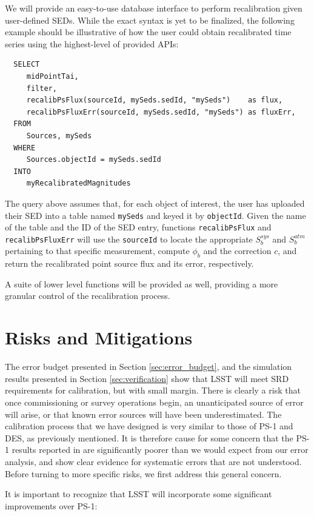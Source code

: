 \documentclass[12pt,preprint]{aastex}
\begin{document}
We will provide an easy-to-use database interface to perform recalibration given user-defined SEDs. While the exact syntax is yet to be finalized, the following example should be illustrative of how the user could obtain recalibrated time series using the highest-level of provided APIs:
%
\begin{verbatim}
  SELECT
     midPointTai,
     filter,
     recalibPsFlux(sourceId, mySeds.sedId, "mySeds")    as flux,
     recalibPsFluxErr(sourceId, mySeds.sedId, "mySeds") as fluxErr,
  FROM
     Sources, mySeds
  WHERE
     Sources.objectId = mySeds.sedId
  INTO
     myRecalibratedMagnitudes
\end{verbatim}
%
The query above assumes that, for each object of interest, the user has uploaded their SED into a table named {\tt mySeds} and keyed it by {\tt objectId}. Given the name of the table and the ID of the SED entry, functions {\tt recalibPsFlux} and {\tt recalibPsFluxErr} will use the {\tt sourceId} to locate the appropriate $S_b^{sys}$ and $S_b^{atm}$ pertaining to that specific measurement, compute $\phi_b$ and the correction $c$, and return the recalibrated point source flux and its error, respectively.

A suite of lower level functions will be provided as well, providing a more granular control of the recalibration process.

\section{Risks and Mitigations}
\label{sec:risks}
The error budget presented in Section \ref{sec:error_budget}, and the simulation results presented in Section \ref{sec:verification} show that
LSST will meet SRD requirements for calibration, but with small margin.   There is clearly a risk
that once commissioning or survey operations begin, an unanticipated source of error will arise, or
that known error sources will have been underestimated.
The calibration process that we have designed is very similar to those of PS-1 and DES, as previously mentioned.  It is therefore
cause for some concern that the PS-1 results reported in \citep{Tonry2012} are 
significantly poorer than we would expect from our
error analysis, and show clear evidence for systematic errors that are not understood.
Before turning to more specific risks, we first address this general concern.

It is important to recognize that LSST will incorporate some significant improvements over PS-1:
\end{document}
